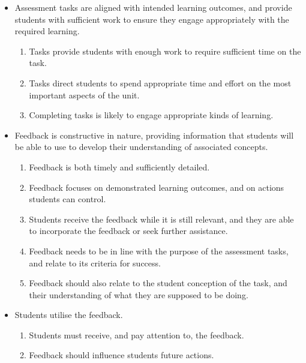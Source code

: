 %

\begin{itemize}[noitemsep,nolistsep]
	\item Assessment tasks are aligned with intended learning outcomes, and provide students with sufficient work to ensure they engage appropriately with the required learning.
	\begin{enumerate}
		\item Tasks provide students with enough work to require sufficient time on the task.
		\item Tasks direct students to spend appropriate time and effort on the most important aspects of the unit.
		\item Completing tasks is likely to engage appropriate kinds of learning.
	\end{enumerate}
	\item Feedback is constructive in nature, providing information that students will be able to use to develop their understanding of associated concepts.
	\begin{enumerate}[noitemsep,nolistsep,start=4]
		\item Feedback is both timely and sufficiently detailed.
		\item Feedback focuses on demonstrated learning outcomes, and on actions students can control.
		\item Students receive the feedback while it is still relevant, and they are able to incorporate the feedback or seek further assistance.
		\item Feedback needs to be in line with the purpose of the assessment tasks, and relate to its criteria for success.
		\item Feedback should also relate to the student conception of the task, and their understanding of what they are supposed to be doing.
	\end{enumerate}
	\item Students utilise the feedback.
	\begin{enumerate}[noitemsep,nolistsep,start=9]
		\item Students must receive, and pay attention to, the feedback.
		\item Feedback should influence students future actions.
	\end{enumerate}
\end{itemize}

